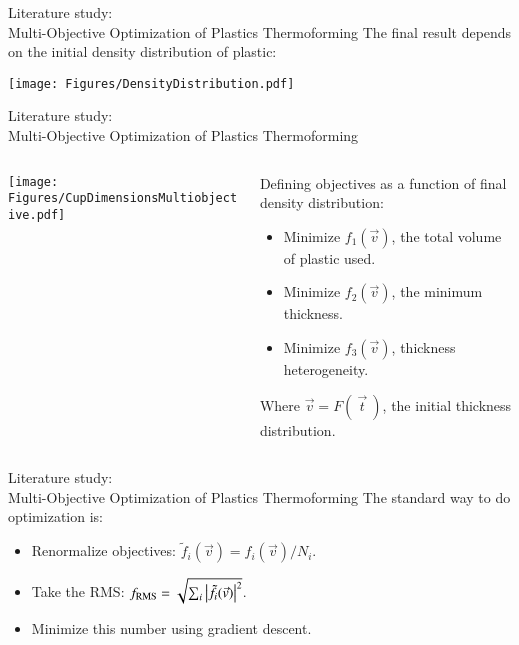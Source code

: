 \documentclass{beamer}
\begin{document}
	\begin{frame}{Literature study:\\ Multi-Objective Optimization of Plastics Thermoforming}
		The final result depends on the initial density distribution of plastic:
		\begin{center}
			\texttt{[image: Figures/DensityDistribution.pdf]}
		\end{center}
	\end{frame}

	\begin{frame}{Literature study:\\ Multi-Objective Optimization of Plastics Thermoforming}
		\begin{columns}
			\begin{column}{0.5\textwidth}
				\texttt{[image: Figures/CupDimensionsMultiobjective.pdf]}
			\end{column}
			\begin{column}{0.5\textwidth}
				Defining objectives as a function of final density distribution:
				\begin{itemize}
					\item Minimize $f_1(\vec v)$, the total volume of plastic used.
					\item Minimize $f_2(\vec v)$, the minimum thickness.
					\item Minimize $f_3(\vec v)$, thickness heterogeneity.
				\end{itemize}
				Where $\vec{v}=F(\:\vec t\:)$, the initial thickness distribution.
			\end{column}
		\end{columns}
	\end{frame}

	\begin{frame}{Literature study:\\ Multi-Objective Optimization of Plastics Thermoforming}
		The standard way to do optimization is:
		\begin{itemize}
			\item Renormalize objectives: $\tilde f_i(\vec v)=f_i(\vec v)/N_i$.
			\item Take the RMS: $f_{\text{RMS}}=\sqrt{\sum_{i}\abs{\tilde{f}_i(\vec{v})}^2}$.
			\item Minimize this number using gradient descent.
		\end{itemize}
	\end{frame}
\end{document}
